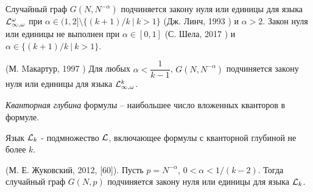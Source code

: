 \begin{theorem}
Случайный граф $G(N, N^{-\alpha})$ подчиняется закону нуля или единицы для языка $\mathcal{L}^\omega_{\infty, \omega}$ при $\alpha \in (1,2] \setminus \{(k+1)/k ~|~ k > 1\}$ (Дж. Линч, 1993  \cite{lynch1993infinitary}) и $\alpha > 2$.
Закон нуля или единицы не выполнен при $\alpha \in [0,1]$ (С. Шела, 2017 \cite{shelah2017failure})  и $\alpha \in \{(k+1)/k ~|~ k > 1\}$.
\end{theorem}

\begin{theorem} (М. Mакартур, 1997 \cite{mcarthur1997asymptotic})
Для любых $\alpha < \dfrac{1}{k-1}$, $G(N, N^{-\alpha})$ подчиняется закону нуля или единицы для языка $\mathcal{L}^k_{\infty, \omega}$.
\end{theorem}

\Def \textit{Кванторная глубина} формулы -- наибольшее число вложенных кванторов в формуле.

\Def Язык $\mathcal{L}_k$ - подмножество $\mathcal{L}$, включающее формулы с кванторной глубиной не более $k$.

\begin{theorem}(М. Е. Жуковский, 2012, [60]). Пусть $p=N^{-\alpha}$, $0 < \alpha < 1/(k - 2)$. 
Тогда случайный граф $G(N, p)$ подчиняется закону нуля или единицы для языка $\mathcal{L}_k$.
\end{theorem}